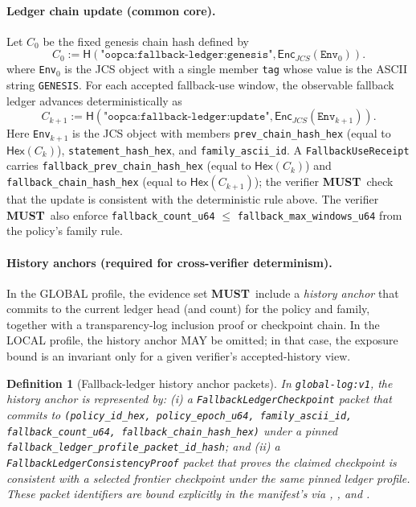 \documentclass[11pt]{article}
\newcommand{\MUST}{\textbf{MUST}}
\newcommand{\Hash}{\mathsf{H}}
\newcommand{\Enc}{\mathsf{Enc}}
\newcommand{\Hex}{\mathsf{Hex}}
\newtheorem{definition}{Definition}
\begin{document}
\paragraph{Ledger chain update (common core).}
Let $C_0$ be the fixed genesis chain hash defined by
\[
C_0 := \Hash(\texttt{"oopca:fallback-ledger:genesis"}, \Enc_{JCS}(\texttt{Env}_0)).
\]
where \texttt{Env}$_0$ is the JCS object with a single member \texttt{tag} whose value is the ASCII string \texttt{GENESIS}.
For each accepted fallback-use window, the observable fallback ledger advances deterministically as
\[
C_{k+1} := \Hash(\texttt{"oopca:fallback-ledger:update"}, \Enc_{JCS}(\texttt{Env}_{k+1})).
\]
Here \texttt{Env}$_{k+1}$ is the JCS object with members \texttt{prev\_chain\_hash\_hex} (equal to $\Hex(C_k)$), \texttt{statement\_hash\_hex}, and \texttt{family\_ascii\_id}.
A \texttt{FallbackUseReceipt} carries \texttt{fallback\_prev\_chain\_hash\_hex} (equal to $\Hex(C_k)$) and \texttt{fallback\_chain\_hash\_hex} (equal to $\Hex(C_{k+1})$); the verifier \MUST\ check that the update is consistent with the deterministic rule above.
The verifier \MUST\ also enforce \texttt{fallback\_count\_u64} $\le$ \texttt{fallback\_max\_windows\_u64} from the policy's family rule.

\paragraph{History anchors (required for cross-verifier determinism).}
In the GLOBAL profile, the evidence set \MUST\ include a \emph{history anchor} that commits to the current ledger head (and count) for the policy and family, together with a transparency-log inclusion proof or checkpoint chain.
In the LOCAL profile, the history anchor MAY be omitted; in that case, the exposure bound is an invariant only for a given verifier's accepted-history view.

\begin{definition}[Fallback-ledger history anchor packets]
In \texttt{global-log:v1}, the history anchor is represented by:
(i) a \texttt{FallbackLedgerCheckpoint} packet that commits to \texttt{(policy\_id\_hex, policy\_epoch\_u64, family\_ascii\_id, fallback\_count\_u64, fallback\_chain\_hash\_hex)} under a pinned \texttt{fallback\_ledger\_profile\_packet\_id\_hash}; and
(ii) a \texttt{FallbackLedgerConsistencyProof} packet that proves the claimed checkpoint is consistent with a selected \emph{frontier} checkpoint under the same pinned ledger profile.
These packet identifiers are bound explicitly in the manifest's  via , , and .
\end{definition}
\end{document}
